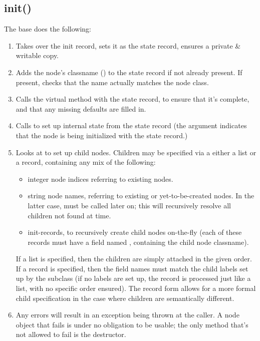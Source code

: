 \documentclass[10pt,twoside]{book}
\begin{document}
\subsection{init()}

  The base  does the following:

  \begin{enumerate}
  
  \item Takes over the init record,  sets it as the state record, ensures a
    private \& writable copy.
    
  \item Adds the node's classname () to the state record if not
    already present. If present, checks that the name actually matches the node
    class.

  \item Calls the virtual  method with the state record,
    to ensure that it's complete, and that any missing defaults are filled in.

  \item Calls  to set up internal state from
    the state record (the  argument indicates that the node is being
    initialized with the state record.)

  \item Looks at  to set up child nodes. Children may be
    specified via a either a list or a record, containing any mix of the
    following:

    \begin{itemize}
      \item integer node indices referring to existing nodes.

      \item string node names, referring to existing or yet-to-be-created
        nodes. In the latter case,  must be called
        later on; this will recursively resolve all children not found at
         time.

      \item init-records, to recursively create child nodes on-the-fly (each of
        these records must have a field named , containing the child
        node classname).

    \end{itemize}

    If a list is specified, then the children are simply attached in the given
    order. If a record is specified, then the field names must match the child
    labels set up by the subclass (if no labels are set up, the record is
    processed just like a list, with no specific order ensured). The record
    form allows for a more formal child specification in the case where
    children are semantically different.
    
  \item Any errors will result in an exception being thrown at the caller. A
    node object that fails  is under no obligation to be usable; the
    only method that's not allowed to fail is the destructor.

  \end{enumerate}
\end{document}
